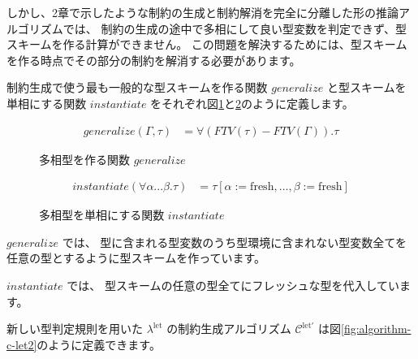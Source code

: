 しかし、2章で示したような制約の生成と制約解消を完全に分離した形の推論アルゴリズムでは、
制約の生成の途中で多相にして良い型変数を判定できず、型スキームを作る計算ができません。
この問題を解決するためには、型スキームを作る時点でその部分の制約を解消する必要があります。

制約生成で使う最も一般的な型スキームを作る関数 $\mathit{generalize}$ と型スキームを単相にする関数
$\mathit{instantiate}$ をそれぞれ図\ref{fig:generalize}と\ref{fig:instantiate}のように定義します。

\begin{figure}[htbp]
  \begin{align*}
    \mathit{generalize}(\Gamma, \tau) &= \forall (FTV(\tau) - FTV(\Gamma)) . \tau
  \end{align*}
  \caption{多相型を作る関数 $\mathit{generalize}$}
  \label{fig:generalize}
\end{figure}

\begin{figure}[htbp]
  \begin{align*}
    \mathit{instantiate}(\forall \alpha ... \beta . \tau) &=
      \tau [\alpha := \mathrm{fresh}, \dots, \beta := \mathrm{fresh}]
  \end{align*}
  \caption{多相型を単相にする関数 $\mathit{instantiate}$}
  \label{fig:instantiate}
\end{figure}

$\mathit{generalize}$ では、
型に含まれる型変数のうち型環境に含まれない型変数全てを任意の型とするように型スキームを作っています。

$\mathit{instantiate}$ では、
型スキームの任意の型全てにフレッシュな型を代入しています。

新しい型判定規則を用いた $\lambda^\mathrm{let}$ の制約生成アルゴリズム
$\mathcal C^\mathrm{let'}$ は図\ref{fig:algorithm-c-let2}のように定義できます。


